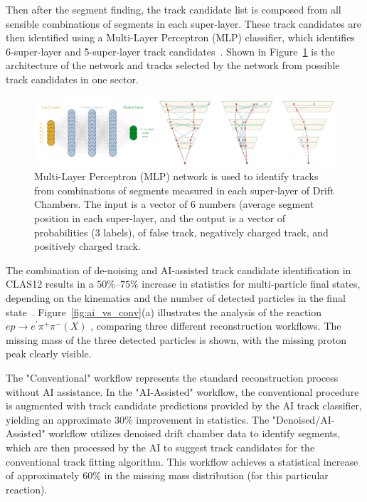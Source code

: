 \documentclass{webofc}
\begin{document}
Then after the segment finding, the track candidate list is composed from all sensible combinations of segments in each super-layer.
These track candidates are then identified using a Multi-Layer Perceptron (MLP) classifier,
which identifies 6-super-layer and 5-super-layer track candidates~\cite{Gavalian:2020oxg}. Shown in Figure~\ref{fig:trackfinder} is 
the architecture of the network and tracks selected by the network from possible track candidates in one sector.

\begin{figure}[h!]
\centering
\includegraphics[width=0.85\columnwidth]{images/track_finder.png}
\caption{Multi-Layer Perceptron (MLP) network is used to identify tracks from combinations of segments measured in each super-layer of Drift Chambers. The input is a vector
of 6 numbers (average segment position in each super-layer, and the output is a vector of probabilities (3 labels), of false track, negatively charged track, and positively charged track. } 
\label{fig:trackfinder}
\end{figure}
The combination of de-noising and AI-assisted track candidate identification in CLAS12 results in a $50\%–75\%$ increase in statistics for multi-particle final states, depending on the kinematics and the number of detected particles in the final state~\cite{Gavalian:2020xmc}. Figure~\ref{fig:ai_vs_conv}(a) illustrates the analysis of the reaction $ep\rightarrow e^\prime\pi^+\pi^-(X)$ , comparing three different reconstruction workflows. The missing mass of the three detected particles is shown, with the missing proton peak clearly visible.

The "Conventional" workflow represents the standard reconstruction process without AI assistance. In the "AI-Assisted" workflow, the conventional procedure is augmented with track candidate predictions provided by the AI track classifier, yielding an approximate $30\%$ improvement in statistics. The "Denoised/AI-Assisted" workflow utilizes denoised drift chamber 
data to identify segments, which are then processed by the AI to suggest track candidates for the conventional track fitting algorithm. This workflow achieves a statistical increase of approximately $60\%$ in the missing mass distribution (for this particular reaction).
\end{document}
